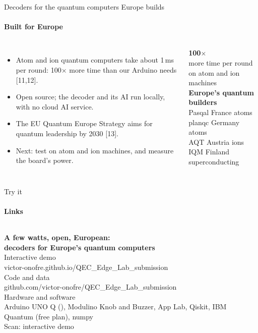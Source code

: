 \documentclass[aspectratio=169,11pt]{beamer}
\newcommand{\eur}{\texteuro}
\newcommand{\hl}[1]{{\color{accent}#1}}
\newcommand{\good}[1]{{\color{green}#1}}
\newcommand{\dimnote}[1]{{\color{dim}\small #1}}
\newcommand{\bignum}[2]{{\color{#1}\fontsize{40}{44}\selectfont\bfseries #2}}
\begin{document}
\begin{frame}{Decoders for the quantum computers Europe builds}\framesubtitle{Built for Europe}
  \begin{columns}[c]
    \begin{itemize}\setlength\itemsep{0.7em}
      \item Atom and ion quantum computers take about 1\,ms per round: \good{100$\times$ more time} than our Arduino needs [11,12].
      \item Open source; the decoder and its AI run locally, with no cloud AI service.
      \item The EU Quantum Europe Strategy aims for quantum leadership by 2030 [13].
      \item \dimnote{Next: test on atom and ion machines, and measure the board's power.}
    \end{itemize}
    \centering
    \bignum{green}{100$\times$}\\ \dimnote{more time per round on atom and ion machines}\\[1em]
    {\color{accent}\bfseries Europe's quantum builders}\\[0.3em]
    {\small Pasqal \textperiodcentered{} France \textperiodcentered{} atoms\\
    planqc \textperiodcentered{} Germany \textperiodcentered{} atoms\\
    AQT \textperiodcentered{} Austria \textperiodcentered{} ions\\
    IQM \textperiodcentered{} Finland \textperiodcentered{} superconducting}
  \end{columns}
\end{frame}

\begin{frame}{Try it}\framesubtitle{Links}
  \begin{columns}[c]
    {\Large\bfseries A few watts, open, European:\\[0.2em] \hl{decoders for Europe's quantum computers}}\\[1.4em]
    {\small
    \dimnote{Interactive demo}\\ \hl{victor-onofre.github.io/QEC\_Edge\_Lab\_submission}\\[0.6em]
    \dimnote{Code and data}\\ \hl{github.com/victor-onofre/QEC\_Edge\_Lab\_submission}\\[0.6em]
    \dimnote{Hardware and software}\\ Arduino UNO Q (\eur59.90), Modulino Knob and Buzzer, App Lab, Qiskit, IBM Quantum (free plan), numpy}
    \centering
    \colorbox{white}{\color{black}}\\[0.5em]
    \dimnote{Scan: interactive demo}
  \end{columns}
\end{frame}
\end{document}
